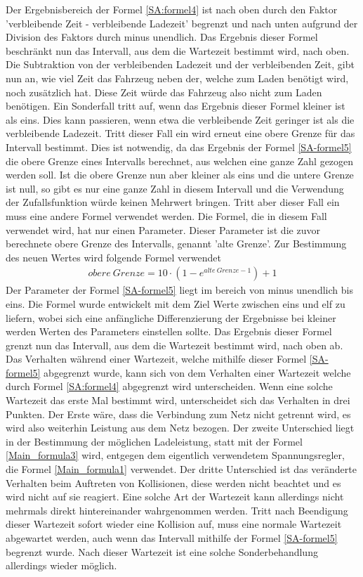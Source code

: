Der Ergebnisbereich der Formel \ref{SA:formel4} ist nach oben durch den Faktor 'verbleibende Zeit - verbleibende Ladezeit' begrenzt und nach unten aufgrund der Division des Faktors durch minus unendlich. Das Ergebnis dieser Formel beschränkt nun das Intervall, aus dem die Wartezeit bestimmt wird, nach oben.  Die Subtraktion von der verbleibenden Ladezeit und der verbleibenden Zeit, gibt nun an, wie viel Zeit das Fahrzeug neben der, welche zum Laden benötigt wird, noch zusätzlich hat. Diese Zeit würde das Fahrzeug also nicht zum Laden benötigen. Ein Sonderfall tritt auf, wenn das Ergebnis dieser Formel kleiner ist als eins. Dies kann passieren, wenn etwa die verbleibende Zeit geringer ist als die verbleibende Ladezeit. Tritt dieser Fall ein wird erneut eine obere Grenze für das Intervall bestimmt. Dies ist notwendig, da das Ergebnis der Formel \ref{SA-formel5} die obere Grenze eines Intervalls berechnet, aus welchen eine ganze Zahl gezogen werden soll. Ist die obere Grenze nun aber kleiner als eins und die untere Grenze ist null, so gibt es nur eine ganze Zahl in diesem Intervall und die Verwendung der Zufallsfunktion würde keinen Mehrwert bringen. Tritt aber dieser Fall ein muss eine andere Formel verwendet werden. Die Formel, die in diesem Fall verwendet wird, hat nur einen Parameter. Dieser Parameter ist die zuvor berechnete obere Grenze des Intervalls, genannt 'alte Grenze'. Zur Bestimmung des neuen Wertes wird folgende Formel verwendet \\
\begin{align}
	obere\ Grenze = 10 \cdot (1 - e^{alte\ Grenze - 1}) + 1
	\label{SA-formel5}
\end{align}
Der Parameter der Formel \ref{SA-formel5} liegt im bereich von minus unendlich bis eins. Die Formel wurde entwickelt mit dem Ziel Werte zwischen eins und elf zu liefern, wobei sich eine anfängliche Differenzierung der Ergebnisse bei kleiner werden Werten des Parameters einstellen sollte. Das Ergebnis dieser Formel grenzt nun das Intervall, aus dem die Wartezeit bestimmt wird, nach oben ab. Das Verhalten während einer Wartezeit, welche mithilfe dieser Formel \ref{SA-formel5} abgegrenzt wurde, kann sich von dem Verhalten einer Wartezeit welche durch Formel \ref{SA:formel4} abgegrenzt wird unterscheiden. Wenn eine solche Wartezeit das erste Mal bestimmt wird, unterscheidet sich das Verhalten in drei Punkten. Der Erste wäre, dass die Verbindung zum Netz nicht getrennt wird, es wird also weiterhin Leistung aus dem Netz bezogen. Der zweite Unterschied liegt in der Bestimmung der möglichen Ladeleistung, statt mit der Formel \ref{Main_formula3} wird, entgegen dem eigentlich verwendetem Spannungsregler, die Formel \ref{Main_formula1} verwendet. Der dritte Unterschied ist das veränderte Verhalten beim Auftreten von Kollisionen, diese werden nicht beachtet und es wird nicht auf sie reagiert. Eine solche Art der Wartezeit kann allerdings nicht mehrmals direkt hintereinander wahrgenommen werden. Tritt nach Beendigung dieser Wartezeit sofort wieder eine Kollision auf, muss eine normale Wartezeit abgewartet werden, auch wenn das Intervall mithilfe der Formel \ref{SA-formel5} begrenzt wurde. Nach dieser Wartezeit ist eine solche Sonderbehandlung allerdings wieder möglich.\\
